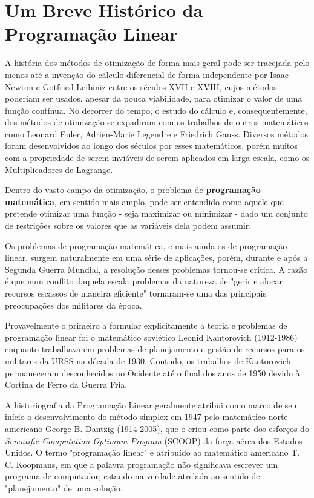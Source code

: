 \section{Um Breve Histórico da Programação Linear}

A história dos métodos de otimização de forma mais geral pode ser tracejada pelo
menos até a invenção do cálculo diferencial de forma independente por Isaac
Newton e Gotfried Leibiniz entre os séculos XVII e XVIII, cujos métodos poderiam ser usados,
apesar da pouca viabilidade, para otimizar o valor de uma função contínua. No decorrer
do tempo, o estudo do cálculo e, consequentemente, dos métodos de otimização se
expadiram com os trabalhos de outros matemáticos como Leonard Euler, Adrien-Marie
Legendre e Friedrich Gauss.
Diversos métodos foram desenvolvidos ao longo dos séculos por esses matemáticos,
porém muitos com a propriedade de serem inviáveis de serem aplicados em larga
escala, como os Multiplicadores de Lagrange.

Dentro do vasto campo da otimização, o problema de \textbf{programação matemática},
em sentido mais amplo, pode ser entendido
como aquele que pretende otimizar uma função - seja maximizar ou minimizar -
dado um conjunto de restrições sobre os valores que as variáveis dela podem
assumir.

Os problemas de programação matemática, e mais ainda os de programação linear,
surgem naturalmente em uma série de aplicações, porém,
durante e após a Segunda Guerra Mundial, a resolução desses problemas
tornou-se crítica. A razão é que num conflito daquela escala
problemas da natureza de "gerir e alocar recursos
escassos de maneira eficiente" tornaram-se uma das principais preocupações dos
militares da época.

Provavelmente o primeiro a formular explicitamente a teoria e problemas de
programação linear foi o matemático soviético Leonid Kantorovich (1912-1986)
enquanto trabalhava em
problemas de planejamento e gestão de recursos para os militares da URSS na
década de 1930. Contudo, os trabalhos de Kantorovich permaneceram desconhecidos
no Ocidente até o final
dos anos de 1950 devido à Cortina de Ferro da Guerra Fria.

A historiografia da Programação Linear geralmente atribui como marco de seu início o
desenvolvimento do método simplex em 1947 pelo matemático norte-americano
George B. Dantzig (1914-2005), que o criou como parte dos esforços do
\textit{Scientific Computation Optimum Program} (SCOOP) da força aérea dos
Estados Unidos. O termo "programação linear" é atribuído ao matemático
americano T. C. Koopmans, em que a palavra programação não significava
escrever um programa de computador, estando na verdade atrelada ao sentido de
"planejamento" de uma solução.


